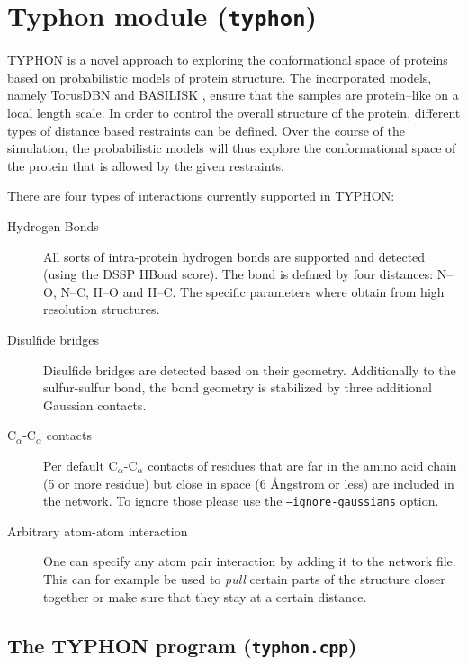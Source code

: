 \chapter{Typhon module (\texttt{typhon})}

TYPHON is a novel approach to exploring the conformational space of
proteins based on probabilistic models of protein structure.  The
incorporated models, namely TorusDBN \cite{boomsma2008gpm} and
BASILISK \cite{harder2010beyond}, ensure that the samples are
protein--like on a local length scale. In order to control the overall
structure of the protein, different types of distance based restraints
can be defined. Over the course of the simulation, the probabilistic
models will thus explore the conformational space of the protein that
is allowed by the given restraints.

There are four types of interactions currently supported in TYPHON:

\begin{description}
\item[Hydrogen Bonds] All sorts of intra-protein hydrogen bonds are
  supported and detected (using the DSSP HBond score). The bond is
  defined by four distances: N--O, N--C, H--O and H--C.  The specific
  parameters where obtain from high resolution structures.
\item[Disulfide bridges] Disulfide bridges are detected based on their
  geometry. Additionally to the sulfur-sulfur bond, the bond geometry
  is stabilized by three additional Gaussian contacts.
\item[$\mathrm{C}_\alpha$-$\mathrm{C}_\alpha$ contacts] Per default $\mathrm{C}_\alpha$-$\mathrm{C}_\alpha$
  contacts of residues that are far in the amino acid chain (5 or more
  residue) but close in space (6 {\AA}ngstrom or less) are included in
  the network. To ignore those please use the
  \texttt{--ignore-gaussians} option.
\item[Arbitrary atom-atom interaction] One can specify any atom pair
  interaction by adding it to the network file. This can for example
  be used to {\emph{pull}} certain parts of the structure closer
  together or make sure that they stay at a certain distance.
\end{description}

\section{The TYPHON program (\texttt{typhon.cpp})}
\label{sec:typhon-executable}

